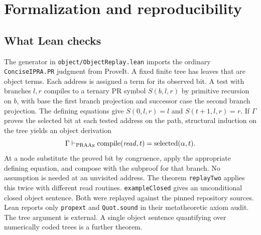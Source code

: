 \section{Formalization and reproducibility}
\label{sec:formal}
\subsection{What Lean checks}
The generator in \texttt{object/ObjectReplay.lean} imports the ordinary \texttt{ConciseIPRA.PR} judgment from ProveIt. A fixed finite tree has leaves that are object terms. Each address is assigned a term for its observed bit. A test with branches $l,r$ compiles to a ternary PR symbol $S(b,l,r)$ by primitive recursion on $b$, with base the first branch projection and successor case the second branch projection. The defining equations give $S(0,l,r)=l$ and $S(t+1,l,r)=r$. If $\Gamma$ proves the selected bit at each tested address on the path, structural induction on the tree yields an object derivation
\[
           \Gamma\vdash_{\rm PRAAx}
           \operatorname{compile}(\mathit{read},t)=\operatorname{selected}(\alpha,t).
\]
At a node substitute the proved bit by congruence, apply the appropriate defining equation, and compose with the subproof for that branch. No assumption is needed at an unvisited address. The theorem \texttt{replayTwo} applies this twice with different read routines. \texttt{exampleClosed} gives an unconditional closed object sentence. Both were replayed against the pinned repository sources. Lean reports only \texttt{propext} and \texttt{Quot.sound} in their metatheoretic axiom audit. The tree argument is external. A single object sentence quantifying over numerically coded trees is a further theorem.

